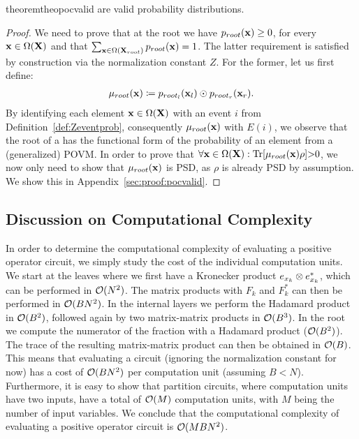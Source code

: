 \begin{restatable}{theorem}{theopocvalid}
	\label{theo:pocvalid}
	\pocs are valid probability distributions.
\end{restatable}

\begin{proof}
	We need to prove that at the root we have $p_{root}(\mathbf{x})\geq 0$, for every $\mathbf{x} \in \Omega(\mathbf{X})$ and that $\sum_{\mathbf{x} \in \Omega(\mathbf{X}_{root})} p_{root}(\mathbf{x})=1$.
	The latter requirement is satisfied by construction via the normalization constant $Z$. For the former, let us first define:
	\begin{align}
		\mu_{root}(\mathbf{x}) \coloneqq p_{root_l}(\mathbf{x}_{l}) \odot  p_{root_r}(\mathbf{x}_{r}).
	\end{align}
	By identifying each element $\mathbf{x} \in \Omega(\mathbf{X})$ with an event $i$ from Definition~\ref{def:Zeventprob}, consequently $\mu_{root}(\mathbf{x})$ with $E(i)$, we observe that the root of a \poc has the functional form of the probability of an element from a (generalized) POVM.
	In order to prove that $\forall \xvars \in \Omega(\Xvars): \Trace[\mu_{root}(\xvars) \rho]{>}0$,
	we now only need to show that $\mu_{root}(\mathbf{x})$ is PSD,
	as $\rho$ is already PSD by assumption.
	We show this in Appendix~\ref{sec:proof:pocvalid}.
\end{proof}



\subsection{Discussion on Computational Complexity}
\label{sec:complexity}

In order to determine the computational complexity of evaluating a positive operator circuit, we simply study the cost of the individual computation units. We start at the leaves where we first have a Kronecker product $ e_{x_k} \otimes  e_{x_k}^*$, which can be performed in $\mathcal{O} (N^2)$. The matrix products with $F_k$ and $F_k^*$ can then be performed in $\mathcal{O} (B N^2)$. In the internal layers we perform the Hadamard product in $\mathcal{O} (B^2)$, followed again by two matrix-matrix products in $\mathcal{O} (B^3)$. In the root we compute the numerator of the fraction with a Hadamard product ($\mathcal{O}(B^2)$). The trace of the resulting matrix-matrix product can then be obtained in $\mathcal{O} (B)$. This means that evaluating a circuit (ignoring the normalization constant for now) has a cost of $\mathcal{O} (BN^2)$ per computation unit (assuming $B<N$). Furthermore, it is easy to show that partition circuits, where computation units have two inputs, have a total of $\mathcal{O} (M)$ computation units, with $M$ being the number of input variables. We conclude that the computational complexity of evaluating a positive operator circuit is $\mathcal{O} (MBN^2)$.


